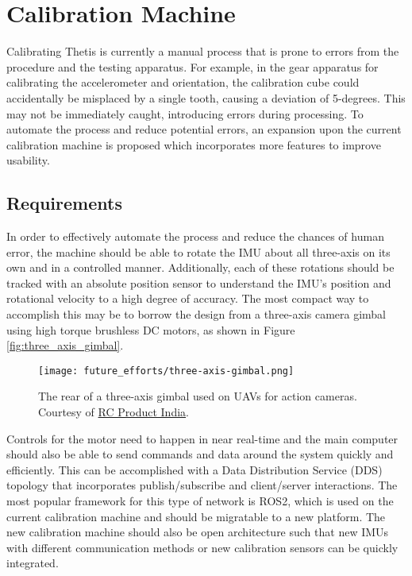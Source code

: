 \section{Calibration Machine} 
Calibrating Thetis is currently a manual process that is prone to errors from the procedure and the testing apparatus.
For example, in the gear apparatus for calibrating the accelerometer and orientation, the calibration cube could accidentally be misplaced by a single tooth, causing a deviation of 5-degrees.
This may not be immediately caught, introducing errors during processing.
To automate the process and reduce potential errors, an expansion upon the current calibration machine is proposed which incorporates more features to improve usability.

\subsection{Requirements} 
In order to effectively automate the process and reduce the chances of human error, the machine should be able to rotate the IMU about all three-axis on its own and in a controlled manner.
Additionally, each of these rotations should be tracked with an absolute position sensor to understand the IMU's position and rotational velocity to a high degree of accuracy.
The most compact way to accomplish this may be to borrow the design from a three-axis camera gimbal using high torque brushless DC motors, as shown in Figure \ref{fig:three_axis_gimbal}.

\begin{figure}
    \centering
    \caption[A three axis gimbal]{The rear of a three-axis gimbal used on UAVs for action cameras. 
    Courtesy of \href{https://www.rcproduct.in/product/feiyutech-oem-sftuav-mini-3d-3-axis-gimbal/}{RC Product India}.}
    \texttt{[image: future\_efforts/three-axis-gimbal.png]}
\end{figure}

Controls for the motor need to happen in near real-time and the main computer should also be able to send commands and data around the system quickly and efficiently.
This can be accomplished with a Data Distribution Service (DDS) topology that incorporates publish/subscribe and client/server interactions.
The most popular framework for this type of network is ROS2, which is used on the current calibration machine and should be migratable to a new platform.
The new calibration machine should also be open architecture such that new IMUs with different communication methods or new calibration sensors can be quickly integrated.

